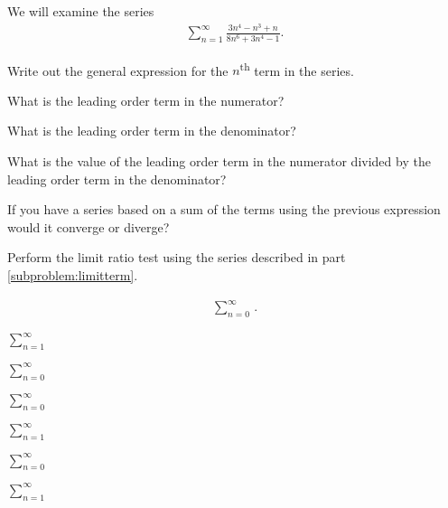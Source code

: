 \begin{problem}
  \item We will examine the series
  \begin{eqnarray*}
    \sum^\infty_{n=1} \frac{3n^4 - n^3 + n}{8n^6 + 3n^4 - 1}.
  \end{eqnarray*}
  \begin{subproblem}
      \item Write out the general expression for the $n$\textsuperscript{th} term in the series.
      \vfill
      \item What is the leading order term in the numerator?
      \vfill
      \item What is the leading order term in the denominator?
      \vfill
      \item What is the value of the leading order term in the numerator divided by the leading order term in the denominator?
      \vfill
      \clearpage
      \item If you have a series based on a sum of the terms using the previous expression would it converge or diverge?
      \label{subproblem:limitterm}
      \vfill
      \item Perform the limit ratio test using the series described in part \ref{subproblem:limitterm}.
      \vfill
      \vfill
      \vfill
  \end{subproblem}
  \clearpage
  \item
  \begin{eqnarray*}
    \sum^\infty_{n=0} \frac{}{}.
  \end{eqnarray*}
  \vfill

  \clearpage

\item
  \begin{subproblem}
    \item $\sum_{n=1}^\infty \frac{}{}$
      \vfill
    \item $\sum_{n=0}^\infty \frac{}{}$
      \vfill
    \item $\sum_{n=0}^\infty \frac{}{} $
      \vfill
      \clearpage
    \item $\sum_{n=1}^\infty \frac{}{}$
      \vfill
    \item $\sum_{n=0}^\infty \frac{}{} $
      \vfill
    \item $\sum_{n=1}^\infty \frac{}{}$
      \vfill
  \end{subproblem}
\end{problem}


\postClass

